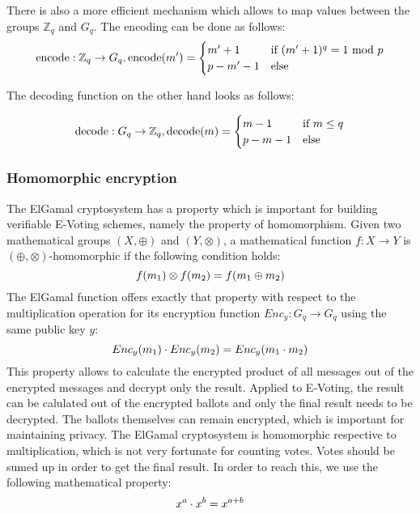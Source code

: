 \documentclass[numbers=noenddot, abstract=on]{scrreprt}
\begin{document}
There is also a more efficient mechanism which allows to
map values between the groups $\mathbb{Z}_q$ and $G_q$. The encoding can be done
as follows:
\begin{equation}
\text{encode} : \mathbb{Z}_q \rightarrow G_q, \text{encode}(m') = 
	\begin{cases}
	m'+1 & \text{if } (m'+1)^q = 1 \text{ mod } p \\
	p-m'-1 & \text{else}
	\end{cases} \notag
\end{equation}

The decoding function on the other hand looks as follows:

\begin{equation}
\text{decode} : G_q \rightarrow \mathbb{Z}_q, \text{decode}(m) = 
	\begin{cases}
	m-1 & \text{if } m \leq q \\
	p-m-1 & \text{else}
	\end{cases} \notag
\end{equation}

\subsubsection{Homomorphic encryption}
\label{sec:homenc}
The ElGamal cryptosystem has a property
which is important for building verifiable E-Voting schemes, namely the property
of homomorphism. Given two mathematical groups $(X,\oplus)$ and $(Y,\otimes)$, a
mathematical function $f:X \rightarrow Y$ is $(\oplus, \otimes)$-homomorphic if
the following condition holds:
\begin{equation}
f(m_1) \otimes f(m_2) = f(m_1 \oplus m_2) \notag
\end{equation}
The ElGamal function offers exactly that property with respect to the
multiplication operation for its encryption function $Enc_y:G_q \rightarrow
G_q$ using the same public key $y$:
\begin{equation}
Enc_y(m_1) \cdot Enc_y(m_2) = Enc_y(m_1 \cdot m_2) \notag
\end{equation}
This property allows to calculate the encrypted product of all messages out of
the encrypted messages and decrypt only the result. Applied to E-Voting, the
result can be calulated out of the encrypted ballots and only the final result
needs to be decrypted. The ballots themselves can remain encrypted, which is
important for maintaining privacy. The ElGamal cryptosystem is homomorphic
respective to multiplication, which is not very fortunate for counting votes.
Votes should be sumed up in order to get the final result. In order to reach
this, we use the following mathematical property:
\begin{equation}
x^a \cdot x^b = x^{a+b} \notag
\end{equation}
\end{document}
